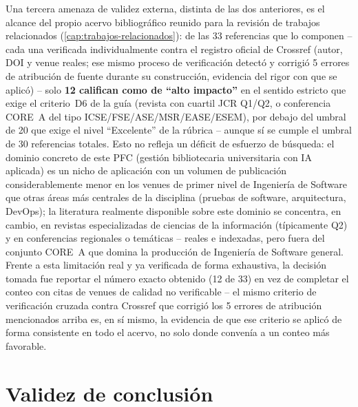 Una tercera amenaza de validez externa, distinta de las dos anteriores,
es el alcance del propio acervo bibliográfico reunido para la revisión de
trabajos relacionados (\autoref{cap:trabajos-relacionados}): de las 33
referencias que lo componen -- cada una verificada individualmente contra
el registro oficial de Crossref (autor, DOI y venue reales; ese mismo
proceso de verificación detectó y corrigió 5 errores de atribución de
fuente durante su construcción, evidencia del rigor con que se aplicó) --
solo \textbf{12 califican como de ``alto impacto''} en el sentido estricto
que exige el criterio~D6 de la guía (revista con cuartil JCR Q1/Q2, o
conferencia CORE~A del tipo ICSE/FSE/ASE/MSR/EASE/ESEM), por debajo del
umbral de 20 que exige el nivel ``Excelente'' de la rúbrica -- aunque sí
se cumple el umbral de 30 referencias totales. Esto no refleja un déficit
de esfuerzo de búsqueda: el dominio concreto de este PFC (gestión
bibliotecaria universitaria con IA aplicada) es un nicho de aplicación con
un volumen de publicación considerablemente menor en los venues de primer
nivel de Ingeniería de Software que otras áreas más centrales de la
disciplina (pruebas de software, arquitectura, DevOps); la literatura
realmente disponible sobre este dominio se concentra, en cambio, en
revistas especializadas de ciencias de la información (típicamente Q2) y
en conferencias regionales o temáticas -- reales e indexadas, pero fuera
del conjunto CORE~A que domina la producción de Ingeniería de Software
general. Frente a esta limitación real y ya verificada de forma
exhaustiva, la decisión tomada fue reportar el número exacto obtenido (12
de 33) en vez de completar el conteo con citas de venues de calidad no
verificable -- el mismo criterio de verificación cruzada contra Crossref
que corrigió los 5 errores de atribución mencionados arriba es, en sí
mismo, la evidencia de que ese criterio se aplicó de forma consistente en
todo el acervo, no solo donde convenía a un conteo más favorable.

\section{Validez de conclusión}

